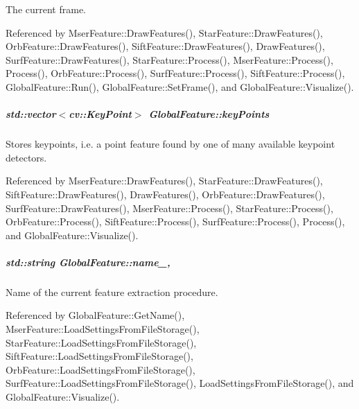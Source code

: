 The current frame. 



Referenced by Mser\-Feature\-::\-Draw\-Features(), Star\-Feature\-::\-Draw\-Features(), Orb\-Feature\-::\-Draw\-Features(), Sift\-Feature\-::\-Draw\-Features(), Draw\-Features(), Surf\-Feature\-::\-Draw\-Features(), Star\-Feature\-::\-Process(), Mser\-Feature\-::\-Process(), Process(), Orb\-Feature\-::\-Process(), Surf\-Feature\-::\-Process(), Sift\-Feature\-::\-Process(), Global\-Feature\-::\-Run(), Global\-Feature\-::\-Set\-Frame(), and Global\-Feature\-::\-Visualize().

\hypertarget{group___feature_extractor_a72cc606c0090a64718a7e92bca7520b9}{
\subparagraph[{key\-Points}]{\setlength{\rightskip}{0pt plus 5cm}std\-::vector$<$cv\-::\-Key\-Point$>$ Global\-Feature\-::key\-Points\hspace{0.3cm}{\ttfamily [inherited]}}}\label{group___feature_extractor_a72cc606c0090a64718a7e92bca7520b9}


Stores keypoints, i.\-e. a point feature found by one of many available keypoint detectors. 



Referenced by Mser\-Feature\-::\-Draw\-Features(), Star\-Feature\-::\-Draw\-Features(), Sift\-Feature\-::\-Draw\-Features(), Draw\-Features(), Orb\-Feature\-::\-Draw\-Features(), Surf\-Feature\-::\-Draw\-Features(), Mser\-Feature\-::\-Process(), Star\-Feature\-::\-Process(), Orb\-Feature\-::\-Process(), Sift\-Feature\-::\-Process(), Surf\-Feature\-::\-Process(), Process(), and Global\-Feature\-::\-Visualize().

\hypertarget{group___feature_extractor_abee52be830de272bd27685083bf28aae}{
\subparagraph[{name\-\_\-}]{\setlength{\rightskip}{0pt plus 5cm}std\-::string Global\-Feature\-::name\-\_\-\hspace{0.3cm}{\ttfamily [protected]}, {\ttfamily [inherited]}}}\label{group___feature_extractor_abee52be830de272bd27685083bf28aae}


Name of the current feature extraction procedure. 



Referenced by Global\-Feature\-::\-Get\-Name(), Mser\-Feature\-::\-Load\-Settings\-From\-File\-Storage(), Star\-Feature\-::\-Load\-Settings\-From\-File\-Storage(), Sift\-Feature\-::\-Load\-Settings\-From\-File\-Storage(), Orb\-Feature\-::\-Load\-Settings\-From\-File\-Storage(), Surf\-Feature\-::\-Load\-Settings\-From\-File\-Storage(), Load\-Settings\-From\-File\-Storage(), and Global\-Feature\-::\-Visualize().

